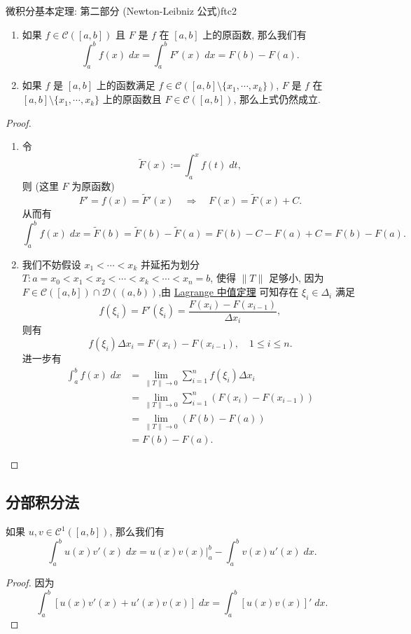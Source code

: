 \documentclass[cn,toc=twocol]{elegantbook}
\newcommand{\ITEMS}{\begin{enumerate}}
\newcommand{\ITEME}{\end{enumerate}}
\newcommand{\D}{\mathscr{D}}
\begin{document}
\begin{theorem}{微积分基本定理: 第二部分 (Newton-Leibniz 公式)}{ftc2}
	\ITEMS
		\item 如果 $f \in \mathscr{C}([a,b])$ 且 $F$ 是 $f$ 在 $[a,b]$ 上的原函数, 那么我们有
		\[
			\int_a^b f(x)\;dx = \int_a^b F'(x)\;dx = F(b) - F(a).
		\]
		\item 如果 $f$ 是 $[a,b]$ 上的函数满足 $f \in \mathscr{C}([a,b] \setminus \{x_1,\cdots,x_k\})$, $F$ 是 $f$ 在 $[a,b] \setminus \{x_1,\cdots,x_k\}$ 上的原函数且 $F \in \mathscr{C}([a,b])$, 那么上式仍然成立.
	\ITEME
\end{theorem}
\begin{proof}
	\ITEMS
	\item 令
		\[
			\widetilde{F}(x) := \int_a^x f(t)\;dt,
		\]
		则 (这里 $F$ 为原函数)
		\[
			F' = f(x) = \widetilde{F}'(x) \quad \Rightarrow \quad F(x) = \widetilde{F}(x) + C.
		\]
		从而有
		\[
			\int_a^b f(x)\;dx = \widetilde{F}(b) = \widetilde{F}(b) - \widetilde{F}(a) = F(b) - C - F(a) + C = F(b) - F(a). 
		\]
	
	\item 我们不妨假设 $x_1 < \cdots < x_k$ 并延拓为划分 $T: a = x_0 < x_1 < x_2 < \cdots < x_k < \cdots < x_n = b$, 使得 $\lVert T \rVert$ 足够小, 因为 $F \in \mathscr{C}([a,b]) \cap \D((a,b))$,由 \hyperref[thm:lagrange]{Lagrange 中值定理} 可知存在 $\xi_i \in \Delta_i$ 满足
	\[
		f(\xi_i) = F'(\xi_i) = \frac{F(x_i)-F(x_{i-1})}{\Delta x_{i}},
	\]
	则有
	\[
		f(\xi_i) \Delta x_{i} = F(x_i)-F(x_{i-1}), \quad 1 \le i \le n.
	\]
	进一步有
	\[
	\begin{aligned}
		\int_a^b f(x)\;dx &= \lim_{\lVert T \rVert \to 0} \sum_{i=1}^n f(\xi_i) \Delta x_{i}\\
		&= \lim_{\lVert T \rVert \to 0} \sum_{i=1}^n (F(x_i)-F(x_{i-1}))\\
		&= \lim_{\lVert T \rVert \to 0} (F(b) - F(a))\\
		&= F(b) - F(a).
	\end{aligned}
	\]
	
	\ITEME
\end{proof}


\subsection{分部积分法}

\begin{theorem}
	如果 $u,v \in \mathscr{C}^1([a,b])$, 那么我们有
	\[
		\int_a^b u(x)v'(x)\;dx = u(x)v(x)\Big|_a^b - \int_a^b v(x)u'(x)\;dx.
	\]  
\end{theorem}
\begin{proof}
	因为
	\[
		\int_a^b \left[u(x)v'(x) + u'(x)v(x)\right]\;dx =  \int_a^b [u(x)v(x)]'\;dx.
	\]	
\end{proof}
\end{document}
